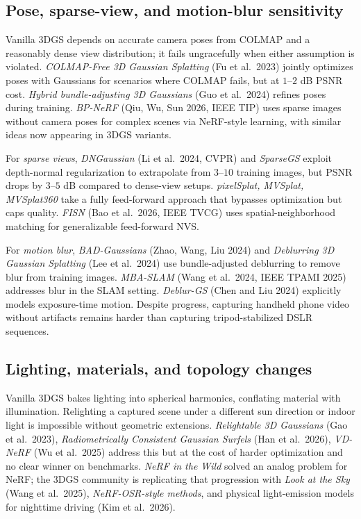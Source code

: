 \subsection{Pose, sparse-view, and motion-blur sensitivity}\label{pose-sparse-view-and-motion-blur-sensitivity}

Vanilla 3DGS depends on accurate camera poses from COLMAP and a reasonably dense view distribution; it fails ungracefully when either assumption is violated. \emph{COLMAP-Free 3D Gaussian Splatting} (Fu et al.~2023) jointly optimizes poses with Gaussians for scenarios where COLMAP fails, but at \(1\)--\(2\) dB PSNR cost. \emph{Hybrid bundle-adjusting 3D Gaussians} (Guo et al.~2024) refines poses during training. \emph{BP-NeRF} (Qiu, Wu, Sun 2026, IEEE TIP) uses sparse images without camera poses for complex scenes via NeRF-style learning, with similar ideas now appearing in 3DGS variants.

For \emph{sparse views}, \emph{DNGaussian} (Li et al.~2024, CVPR) and \emph{SparseGS} exploit depth-normal regularization to extrapolate from \(3\)--\(10\) training images, but PSNR drops by \(3\)--\(5\) dB compared to dense-view setups. \emph{pixelSplat, MVSplat, MVSplat360} take a fully feed-forward approach that bypasses optimization but caps quality. \emph{FISN} (Bao et al.~2026, IEEE TVCG) uses spatial-neighborhood matching for generalizable feed-forward NVS.

For \emph{motion blur}, \emph{BAD-Gaussians} (Zhao, Wang, Liu 2024) and \emph{Deblurring 3D Gaussian Splatting} (Lee et al.~2024) use bundle-adjusted deblurring to remove blur from training images. \emph{MBA-SLAM} (Wang et al.~2024, IEEE TPAMI 2025) addresses blur in the SLAM setting. \emph{Deblur-GS} (Chen and Liu 2024) explicitly models exposure-time motion. Despite progress, capturing handheld phone video without artifacts remains harder than capturing tripod-stabilized DSLR sequences.

\subsection{Lighting, materials, and topology changes}\label{lighting-materials-and-topology-changes}

Vanilla 3DGS bakes lighting into spherical harmonics, conflating material with illumination. Relighting a captured scene under a different sun direction or indoor light is impossible without geometric extensions. \emph{Relightable 3D Gaussians} (Gao et al.~2023), \emph{Radiometrically Consistent Gaussian Surfels} (Han et al.~2026), \emph{VD-NeRF} (Wu et al.~2025) address this but at the cost of harder optimization and no clear winner on benchmarks. \emph{NeRF in the Wild} solved an analog problem for NeRF; the 3DGS community is replicating that progression with \emph{Look at the Sky} (Wang et al.~2025), \emph{NeRF-OSR-style methods}, and physical light-emission models for nighttime driving (Kim et al.~2026).

